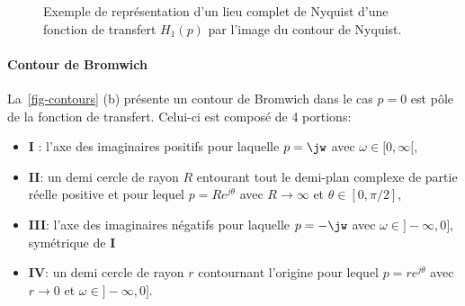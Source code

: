 \begin{figure}[!h]
    \caption{Exemple de représentation d'un lieu complet de Nyquist d'une 
             fonction de transfert $H_1(p)$ par l'image du contour de 
             Nyquist. \label{fig-nyquist_complet_contour}}
\end{figure}

\paragraph{Contour de Bromwich}

La~\cref{fig-contours} (b) présente un contour de Bromwich dans le cas $p=0$ 
est pôle de la fonction de transfert. Celui-ci est composé de 4 portions:
\begin{itemize}
    \item \textbf{I} : l'axe des imaginaires positifs pour laquelle 
          $p=\jw$ avec $\omega\in[0,\infty[$,
    \item \textbf{II}: un demi cercle de rayon $R$ entourant tout le demi-plan 
          complexe de partie réelle positive 
          et pour lequel $p=Re^{j\theta}$ avec $R\rightarrow\infty$ et 
          $\theta\in[0,\pi/2]$,
    \item \textbf{III}: l'axe des imaginaires négatifs  pour laquelle $p=-\jw$ 
          avec $\omega\in]-\infty,0]$, symétrique de \textbf{I}
    \item \textbf{IV}:  un demi cercle de rayon $r$ contournant l'origine 
          pour lequel $p=re^{j\theta}$ avec $r\rightarrow0$ et 
          $\omega\in]-\infty,0]$.
\end{itemize}

